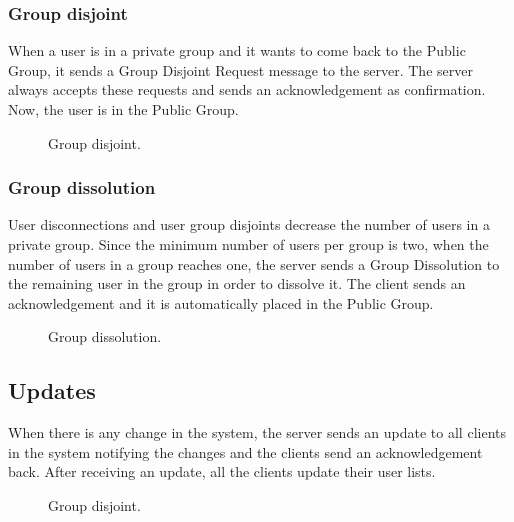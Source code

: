 \documentclass{article}
\begin{document}
\subsubsection{Group disjoint}
When a user is in a private group and it wants to come back to the Public Group, it sends a Group Disjoint Request message to the server. The server always accepts these requests and sends an acknowledgement as confirmation. Now, the user is in the Public Group.
\begin{figure}[H]
    \centering
    \begin{sequencediagram}

    \end{sequencediagram}
    \caption{Group disjoint.}
\end{figure}

\subsubsection{Group dissolution}
User disconnections and user group disjoints decrease the number of users in a private group. Since the minimum number of users per group is two, when the number of users in a group reaches one, the server sends a Group Dissolution to the remaining user in the group in order to dissolve it. The client sends an acknowledgement and it is automatically placed in the Public Group.
\begin{figure}[H]
    \centering
    \begin{sequencediagram}

    \end{sequencediagram}
    \caption{Group dissolution.}
\end{figure}

\subsection{Updates}
When there is any change in the system, the server sends an update to all clients in the system notifying the changes and the clients send an acknowledgement back. After receiving an update, all the clients update their user lists.
\begin{figure}[H]
    \centering
    \begin{sequencediagram}

    \end{sequencediagram}
    \caption{Group disjoint.}
\end{figure}
\end{document}
